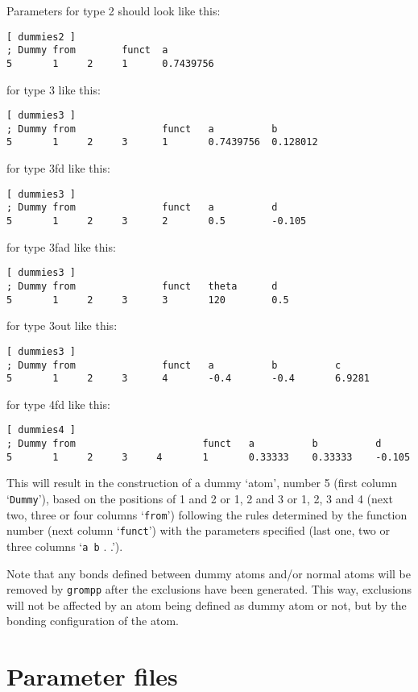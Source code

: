 Parameters for type 2 should look like this:
{\small\begin{verbatim}
[ dummies2 ] 
; Dummy from        funct  a 
5       1     2     1      0.7439756
\end{verbatim}}

for type 3 like this:
{\small\begin{verbatim}
[ dummies3 ]
; Dummy from               funct   a          b
5       1     2     3      1       0.7439756  0.128012
\end{verbatim}}

for type 3fd like this:
{\small\begin{verbatim}
[ dummies3 ]
; Dummy from               funct   a          d
5       1     2     3      2       0.5        -0.105
\end{verbatim}}

for type 3fad like this:
{\small\begin{verbatim}
[ dummies3 ]
; Dummy from               funct   theta      d
5       1     2     3      3       120        0.5
\end{verbatim}}

for type 3out like this:
{\small\begin{verbatim}
[ dummies3 ]
; Dummy from               funct   a          b          c
5       1     2     3      4       -0.4       -0.4       6.9281
\end{verbatim}}

for type 4fd like this:
{\small\begin{verbatim}
[ dummies4 ]
; Dummy from                      funct   a          b          d
5       1     2     3     4       1       0.33333    0.33333    -0.105
\end{verbatim}}

This will result in the construction of a dummy `atom', number 5
(first column `{\tt Dummy}'), based on the positions of 1 and 2 or 1,
2 and 3 or 1, 2, 3 and 4 (next two, three or four columns
`{\tt from}') following the rules determined by the function number
(next column `{\tt funct}') with the parameters specified (last one,
two or three columns `{\tt a b} . .').

Note that any bonds defined between dummy atoms and/or normal atoms
will be removed by {\tt grompp} after the exclusions have been
generated. This way, exclusions will not be affected by an atom being
defined as dummy atom or not, but by the bonding configuration of the
atom.

\section{Parameter files}
\label{sec:paramfiles}
